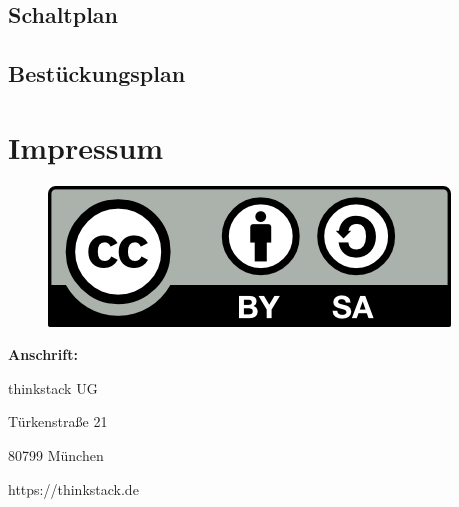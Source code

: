 \documentclass[fleqn,10pt]{SelfArx} %
\begin{document}
 \subsection*{Schaltplan}

 \subsection*{Bestückungsplan}


\section*{Impressum} %


\begin{figure}[tbhp]
\includegraphics[width=0.3\linewidth]{cc}
\end{figure}

\textbf{Anschrift:}

thinkstack UG

Türkenstraße 21

80799 München

https://thinkstack.de




%

\end{document}
